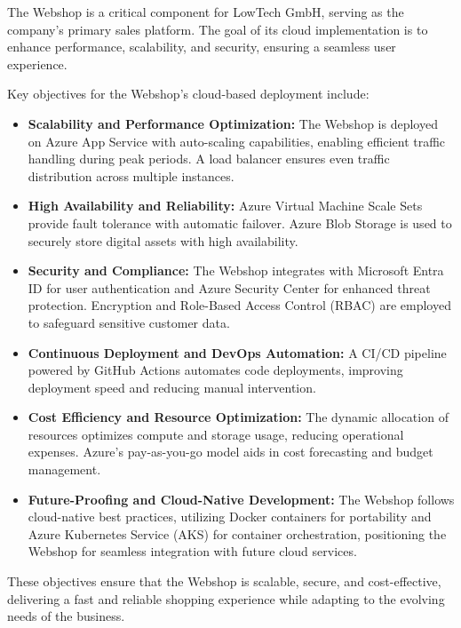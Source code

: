 \documentclass{llncs}
\begin{document}
The Webshop is a critical component for LowTech GmbH, serving as the company’s primary sales platform. The goal of its cloud implementation is to enhance performance, scalability, and security, ensuring a seamless user experience.

Key objectives for the Webshop's cloud-based deployment include:

\begin{itemize}
    \item \textbf{Scalability and Performance Optimization:}  
    The Webshop is deployed on Azure App Service with auto-scaling capabilities, enabling efficient traffic handling during peak periods. A load balancer ensures even traffic distribution across multiple instances.
    \bigskip %
    \item \textbf{High Availability and Reliability:}  
    Azure Virtual Machine Scale Sets provide fault tolerance with automatic failover. Azure Blob Storage is used to securely store digital assets with high availability.
    \bigskip %
    \item \textbf{Security and Compliance:}  
    The Webshop integrates with Microsoft Entra ID for user authentication and Azure Security Center for enhanced threat protection. Encryption and Role-Based Access Control (RBAC) are employed to safeguard sensitive customer data.
    \bigskip %
    \item \textbf{Continuous Deployment and DevOps Automation:}  
    A CI/CD pipeline powered by GitHub Actions automates code deployments, improving deployment speed and reducing manual intervention.
    \bigskip %
    \item \textbf{Cost Efficiency and Resource Optimization:}  
    The dynamic allocation of resources optimizes compute and storage usage, reducing operational expenses. Azure’s pay-as-you-go model aids in cost forecasting and budget management.
    \bigskip %
    \item \textbf{Future-Proofing and Cloud-Native Development:}  
    The Webshop follows cloud-native best practices, utilizing Docker containers for portability and Azure Kubernetes Service (AKS) for container orchestration, positioning the Webshop for seamless integration with future cloud services.
\end{itemize}

These objectives ensure that the Webshop is scalable, secure, and cost-effective, delivering a fast and reliable shopping experience while adapting to the evolving needs of the business.
\end{document}
